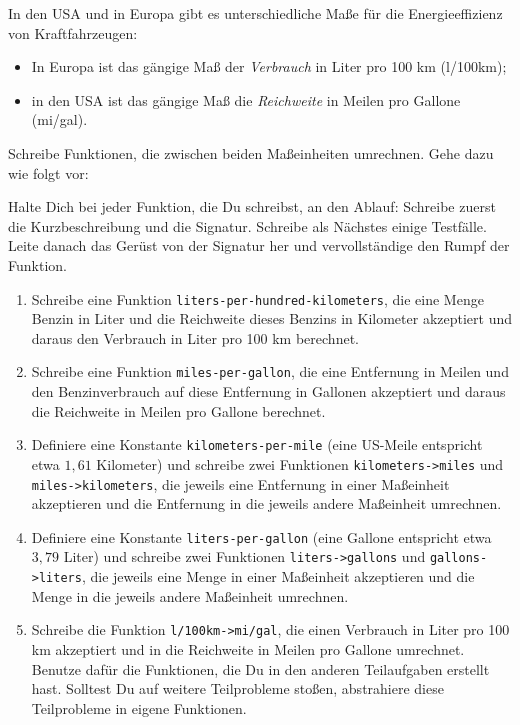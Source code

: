 \begin{aufgabe}

  In den USA und in Europa gibt es unterschiedliche
  Maße für die Energieeffizienz von Kraftfahrzeugen:
  \begin{itemize}
  \item In Europa ist das gängige Maß der \emph{Verbrauch} in Liter
    pro 100 km (l/100km);
  \item in den USA ist das gängige Maß die \emph{Reichweite} in Meilen
    pro Gallone (mi/gal).
  \end{itemize}
  Schreibe Funktionen, die zwischen beiden Maßeinheiten
  umrechnen.  Gehe dazu wie folgt vor:

  Halte Dich bei jeder Funktion, die Du schreibst, an den
  Ablauf: Schreibe zuerst die Kurzbeschreibung
  und die Signatur.  Schreibe als Nächstes einige Testfälle.
  Leite danach das Gerüst von der Signatur her und vervollständige
  den Rumpf der Funktion.

  \begin{enumerate}

  \item Schreibe eine Funktion
    \texttt{liters-per-hundred-kilometers}, die eine Menge Benzin in
    Liter und die Reichweite dieses Benzins in Kilometer akzeptiert
    und daraus den Verbrauch in Liter pro 100 km berechnet.

  \item Schreibe eine Funktion
    \texttt{miles-per-gallon}, die eine Entfernung in Meilen und den
    Benzinverbrauch auf diese Entfernung in Gallonen akzeptiert und
    daraus die Reichweite in Meilen pro Gallone berechnet.

  \item Definiere eine Konstante
    \texttt{kilometers-per-mile} (eine US-Meile entspricht etwa $1,61$
    Kilometer) und schreibe zwei Funktionen
    \texttt{kilometers->miles} und \texttt{miles->kilometers}, die
    jeweils eine Entfernung in einer Maßeinheit akzeptieren und die
    Entfernung in die jeweils andere Maßeinheit umrechnen.

  \item Definiere eine Konstante
    \texttt{liters-per-gallon} (eine Gallone entspricht etwa $3,79$
    Liter) und schreibe zwei Funktionen \texttt{liters->gallons}
    und \texttt{gallons->liters}, die jeweils eine Menge in einer
    Maßeinheit akzeptieren und die Menge in die jeweils andere
    Maßeinheit umrechnen.

  \item Schreibe die Funktion
    \texttt{l/100km->mi/gal}, die einen Verbrauch in Liter pro 100 km
    akzeptiert und in die Reichweite in Meilen pro Gallone umrechnet.
    Benutze dafür die Funktionen, die Du in den anderen
    Teilaufgaben erstellt hast.  Solltest Du auf weitere Teilprobleme
    stoßen, abstrahiere diese Teilprobleme in eigene Funktionen.


\end{enumerate}
\end{aufgabe}
